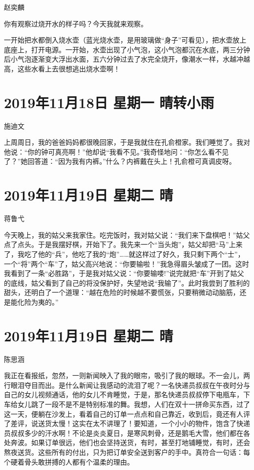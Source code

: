 赵奕麟

你有观察过烧开水的样子吗？今天我就来观察。

一开始把水都倒入烧水壶（蓝光烧水壶，是用玻璃做``身子''可看见），把水壶放上底座上，打开电源。一开始，水壶出现了小气泡，这小气泡都沉在水底，两三分钟后小气泡逐渐变大浮出水面，五六分钟过去了水完全烧开，像潮水一样，水越冲越高，这些水看上去很想逃出烧水壶啊！

\section{2019年11月18日 星期一 晴转小雨}

施迪文

上周周日，我的爸爸妈妈都很晚回家，于是我就住在孔俞橙家。我们睡觉了。我对他说：``你的钟可真亮啊！''他却说``我看不见。''我奇怪地问：``你怎么看不见了？''她回答道：``因为我有内裤。''什么？内裤戴在头上！孔俞橙可真调皮呀。

\section{2019年11月19日 星期二 晴}

蒋鲁弋

今天晚上，我的姑父来我家住。吃完饭时，我对姑父说：``我们来下盘棋吧！''姑父点了点头。于是我摆好棋，开始下了。我先来一个``当头炮''，姑父却把``马''上来了，我吃了他的``兵''，他吃了我的``炮''\ldots\ldots 就这样过了好久，我只剩下两个``士''，一个``将''两个``车''了，姑父高兴地说：``你要输啦！''我急得眉头皱成了一团。这时我看到了一条``必胜路''，于是我对姑父说：``你要输喽!''说完就把``车''开到了姑父的底线，姑父看到了自己的将没保护好，失望地说``我输了''。此时我尝到了胜利的甜头，还明白了一个道理：``越在危险的时候越不要慌张，只要稍微动动脑筋，还是能化险为夷的。''

\section{2019年11月19日 星期二 晴}

陈思涵

我正在看报纸，忽然，一则新闻映入了我的眼帘，吸引了我的眼球。不一会儿，两行眼泪夺目而出。是什么新闻让我感动的流泪了呢？一名快递员叔叔在午夜时分与自己的女儿视频通话，他的女儿不肯睡觉，于是，那名快递员叔叔停下电瓶车，下车给女儿跳了一段不是不是特别标准的舞。我想，人们在双十一拼命买东西，过了这一天，便躺在沙发上，看着自己的订单一点点和自己靠近，收到后，竟还有人评了差评，说送货太慢！这实在太不讲理了！要知道，一个小小的物件，饱含了快递员叔叔多少的汗水啊！不论是炎炎夏日，是寒风刺骨，还是鹅毛大雪，他们都在各处奔波。如果订单很远，他们也会坚持送货，有时，甚至打地铺睡觉，有时，还会熬夜送货。这些所有的付出，只为把订单安全送到客户的手中。真符合一句话：每个硬着骨头敢拼搏的人都有个温柔的理由。

